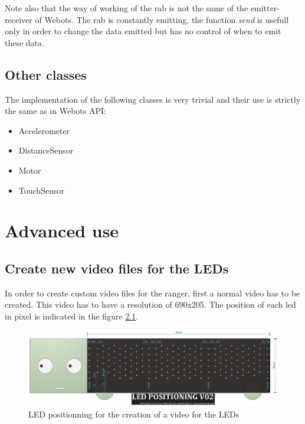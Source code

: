 \documentclass[a4paper,11pt]{report}
\begin{document}
Note also that the way of working of the rab is not the same of the emitter-receiver of Webots. The rab is constantly emitting, the function \textit{send} is usefull only in order to change the data emitted but has no control of when to emit these data.\\

\newpage
\section{Other classes}

The implementation of the following classes is very trivial and their use is strictly the same as in Webots API:
\begin{itemize}
  \item Accelerometer
  \item DistanceSensor
  \item Motor
  \item TouchSensor
\end{itemize}

\newpage
\chapter{Advanced use}
\section{Create new video files for the LEDs}
In order to create custom video files for the ranger, first a normal video has to be created. This video has to have a resolution of 690x205. The position of each led in pixel is indicated in the figure \ref{fig:VideoSize}.\\

\begin{figure}[H]
  \begin{center}
    \includegraphics[width=14cm]{VideoSize.png}
    \caption{LED positionning for the creation of a video for the LEDs}
    \label{fig:VideoSize}
  \end{center}
\end{figure}
\end{document}
